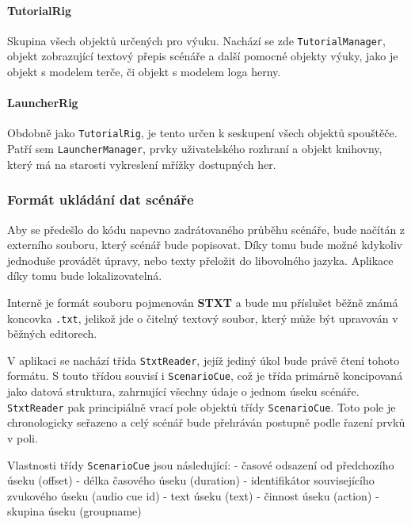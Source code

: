 \paragraph{TutorialRig}\label{tutorialrig}

Skupina všech objektů určených pro výuku. Nachází se zde
\texttt{TutorialManager}, objekt zobrazující textový přepis scénáře a
další pomocné objekty výuky, jako je objekt s modelem terče, či objekt s
modelem loga herny.

\paragraph{LauncherRig}\label{launcherrig}

Obdobně jako \texttt{TutorialRig}, je tento určen k seskupení všech
objektů spouštěče. Patří sem \texttt{LauncherManager}, prvky
uživatelského rozhraní a objekt knihovny, který má na starosti
vykreslení mřížky dostupných her.

\subsubsection{Formát ukládání dat
scénáře}\label{formuxe1t-ukluxe1duxe1nuxed-dat-scuxe9nuxe1ux159e}

Aby se předešlo do kódu napevno zadrátovaného průběhu scénáře, bude
načítán z externího souboru, který scénář bude popisovat. Díky tomu bude
možné kdykoliv jednoduše provádět úpravy, nebo texty přeložit do
libovolného jazyka. Aplikace díky tomu bude lokalizovatelná.

Interně je formát souboru pojmenován \textbf{STXT} a bude mu příslušet
běžně známá koncovka \texttt{.txt}, jelikož jde o čitelný textový
soubor, který může být upravován v běžných editorech.

V aplikaci se nachází třída \texttt{StxtReader}, jejíž jediný úkol bude
právě čtení tohoto formátu. S touto třídou souvisí i
\texttt{ScenarioCue}, což je třída primárně koncipovaná jako datová
struktura, zahrnující všechny údaje o jednom úseku scénáře.
\texttt{StxtReader} pak principiálně vrací pole objektů třídy
\texttt{ScenarioCue}. Toto pole je chronologicky seřazeno a celý scénář
bude přehráván postupně podle řazení prvků v poli.

Vlastnosti třídy \texttt{ScenarioCue} jsou následující: - časové
odsazení od předchozího úseku (offset) - délka časového úseku (duration)
- identifikátor souvisejícího zvukového úseku (audio cue id) - text
úseku (text) - činnost úseku (action) - skupina úseku (groupname)

